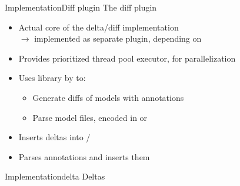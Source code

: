 \begin{frame}{Implementation}{Diff plugin}
	{\Large The diff plugin}
	\\[1.5em]
	\begin{itemize}
		\item Actual core of the delta/diff implementation\\
			$\rightarrow$ implemented as separate plugin, depending on \masymos
		\item Provides prioritized thread pool executor, for parallelization 
		\item Uses \bives library by \citeauthor{Scharm2015} to:
		\begin{itemize}
			\item Generate diffs of models with \comodi \nocite{Scharm2016} annotations
			\item Parse model files, encoded in \sbml or \cellml
		\end{itemize}
		\item Inserts deltas into \neoj/\masymos
		\item Parses \rdf \comodi annotations and inserts them
	\end{itemize}
\end{frame}

\begin{frame}{Implementation}{\bives delta}
	\centering
	\LARGE \bives Deltas
\end{frame}


